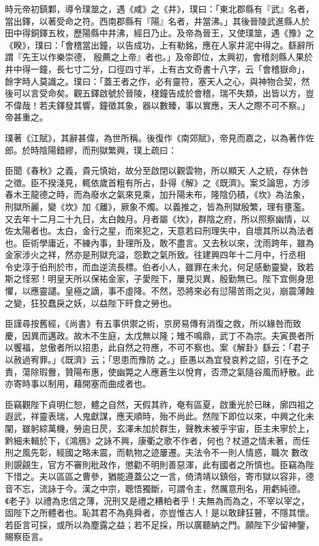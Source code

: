 \begin{pinyinscope}
 時元帝初鎮鄴，導令璞筮之，遇《咸》之《井》，璞曰：「東北郡縣有『武』名者，當出鐸，以著受命之符。西南郡縣有『陽』名者，井當沸。」其後晉陵武進縣人於田中得銅鐸五枚，歷陽縣中井沸，經日乃止。及帝為晉王，又使璞筮，遇《豫》之《睽》，璞曰：「會稽當出鐘，以告成功，上有勒銘，應在人家井泥中得之。繇辭所謂『先王以作樂崇德，
 殷薦之上帝』者也。」及帝即位，太興初，會稽剡縣人果於井中得一鐘，長七寸二分，口徑四寸半，上有古文奇書十八字，云「會稽嶽命」，餘字時人莫識之。璞曰：「蓋王者之作，必有靈符，塞天人之心，與神物合契，然後可以言受命矣。觀五鐸啟號於晉陵，棧鐘告成於會稽，瑞不失類，出皆以方，豈不偉哉！若夫鐸發其響，鐘徵其象，器以數臻，事以實應，天人之際不可不察。」帝甚重之。



 璞著《江賦》，其辭甚偉，為世所稱。後復作《南郊賦》，帝見而嘉之，以為著作佐郎。於時陰陽錯繆，而刑獄繁興，璞上疏曰：



 臣聞《春秋》之義，貴元慎始，故分至啟閉以觀雲物，所以顯天
 人之統，存休咎之徵。臣不揆淺見，輒依歲首粗有所占，卦得《解》之《既濟》。案爻論思，方涉春木王龍德之時，而為廢水之氣來見乘，加升陽未布，隆陰仍積，《坎》為法象，刑獄所麗，變《坎》加《離》，厥象不燭。以義推之，皆為刑獄殷繁，理有壅濫。又去年十二月二十九日，太白蝕月。月者屬《坎》，群陰之府，所以照察幽情，以佐太陽者也。太白，金行之星，而來犯之，天意若曰刑理失中，自壞其所以為法者也。臣術學庸近，不練內事，卦理所及，敢不盡言。又去秋以來，沈雨跨年，雖為金家涉火之祥，然亦是刑獄充溢，怨歎之氣所致。往建興四年十二月中，行丞相
 令史淳于伯刑於市，而血逆流長標。伯者小人，雖罪在未允，何足感動靈變，致若斯之怪邪！明皇天所以保祐金家，子愛陛下，屢見災異，殷勤無已。陛下宜側身思懼，以應靈譴。皇極之謫，事不虛降。不然，恐將來必有愆陽苦雨之災，崩震薄蝕之變，狂狡蠢戾之妖，以益陛下旰食之勞也。



 臣謹尋按舊經，《尚書》有五事供禦之術，京房易傳有消復之救，所以緣咎而致慶，因異而邁政。故木不生庭，太戊無以隆；雉不鳴鼎，武丁不為宗。夫寅畏者所以饗福，怠傲者所以招患，此自然之符應，不可不察也。案《解卦》繇云：「君子以赦過宥罪。」《既濟》云；「思患而豫防
 之。」臣愚以為宜發哀矜之詔，引在予之責，蕩除瑕釁，贊陽布惠，使幽斃之人應蒼生以悅育，否滯之氣隨谷風而紓散。此亦寄時事以制用，藉開塞而曲成者也。



 臣竊觀陛下貞明仁恕，體之自然，天假其祚，奄有區夏，啟重光於已昧，廓四祖之遐武，祥靈表瑞，人鬼獻謀，應天順時，殆不尚此。然陛下即位以來，中興之化未闡，雖躬綜萬機，勞逾日昃，玄澤未加於群生，聲教未被乎宇宙，臣主未寧於上，黔細未輯於下，《鴻鴈》之詠不興，康衢之歌不作者，何也？杖道之情未著，而任刑之風先彰，經國之略未震，而軌物之迹屢遷。夫法令不一則人情惑，職次
 數改則覬覦生，官方不審則秕政作，懲勸不明則善惡渾，此有國者之所慎也。臣竊為陛下惜之。夫以區區之曹參，猶能遵蓋公之一言，倚清靖以鎮俗，寄市獄以容非，德音不忘，流詠于今。漢之中宗，聰悟獨斷，可謂令主，然厲意刑名，用虧純德。《老子》以禮為忠信之薄，況刑又是禮之糟粕者乎！夫無為而為之，不宰以宰之，固陛下之所體者也。恥其君不為堯舜者，亦豈惟古人！是以敢肆狂瞽，不隱其懷。若臣言可採，或所以為塵露之益；若不足採，所以廣聽納之門。願陛下少留神鑒，賜察臣言。




\end{pinyinscope}
